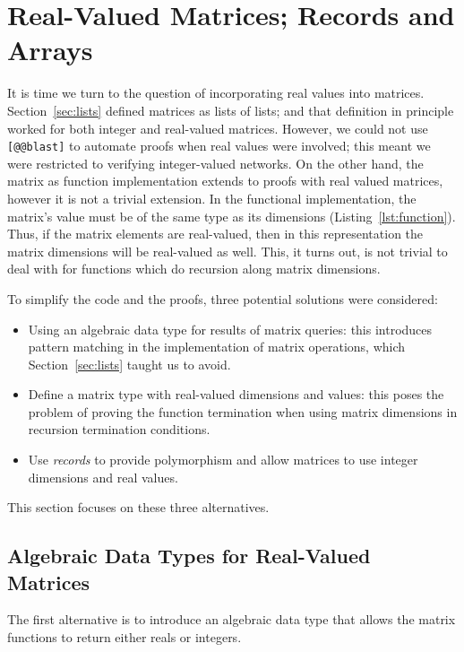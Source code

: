 \documentclass[runningheads]{llncs}
\newcommand{\knote}[1]{\todo[inline, color=blue!20]{#1}}
\begin{document}
\section{Real-Valued Matrices; Records  and Arrays}\label{sec:records}

It is time we turn to the question of incorporating real values into matrices.
Section~\ref{sec:lists} defined matrices as lists of lists; and that definition
in principle worked for both integer and real-valued matrices. However, we could
not use \lstinline{[@@blast]} to automate proofs when real values were involved;
this meant we were restricted to verifying integer-valued networks. On the
other hand, the matrix as function implementation extends to proofs with real
valued matrices, however it is not a trivial extension. In the functional
implementation, the matrix's value must be of
the same type as its dimensions (Listing~\ref{lst:function}). Thus, if the matrix elements are real-valued, then
in this representation the matrix dimensions will be real-valued as well. This,
it turns out, is not trivial to deal with for functions which do recursion along
matrix dimensions.


To simplify the code and the proofs, three potential solutions were considered:
\begin{itemize}
	\item Using an algebraic data type for results of matrix queries: this introduces pattern matching in the implementation of matrix operations, which Section~\ref{sec:lists} taught us to avoid.
	\item Define a matrix type with real-valued dimensions and values: this poses the problem of proving the function termination when using matrix dimensions in recursion termination conditions.
	\item Use \emph{records} to provide polymorphism and allow matrices to use integer dimensions and real values.
\end{itemize}

This section focuses on these three alternatives.

\subsection{Algebraic Data Types for  Real-Valued Matrices}

The first alternative is to introduce an algebraic data type that allows the matrix functions to return either reals or integers. 
\end{document}

